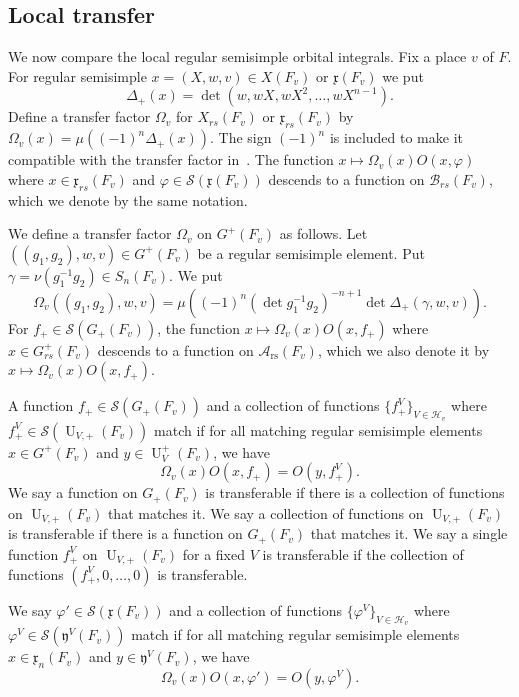 \documentclass[letterpaper,11pt]{amsart}
\newcommand{\fx}{\mathfrak{x}}
\newcommand{\fy}{\mathfrak{y}}
\newcommand{\cA}{\mathcal{A}}
\newcommand{\cB}{\mathcal{B}}
\newcommand{\cH}{\mathcal{H}}
\newcommand{\cS}{\mathcal{S}}
\newcommand{\<}{\negthickspace}
\DeclareMathOperator{\U}{U}
\theoremstyle{definition}
\theoremstyle{plain}
\theoremstyle{remark}
\numberwithin{equation}{section}
\begin{document}
\subsection{Local transfer}

We now compare the local regular semisimple orbital integrals. Fix a place $v$ of $F$. For regular semisimple $x = (X, w, v) \in X(F_v)$ or
$\fx(F_v)$ we put
    \[
    \Delta_+(x) =
    \det(w, wX, w X^2, \hdots, w X^{n-1}).
    \]
Define a transfer factor $\Omega_v$ for $X_{rs}(F_v)$ or $\fx_{rs}(F_v)$ by
$\Omega_v(x) = \mu((-1)^n\Delta_+(x))$. The sign $(-1)^n$ is included to make
it compatible with the transfer factor in~\cite{BP1}. The function $x \mapsto
\Omega_v(x) O(x, \varphi)$ where $x \in \fx_{rs}(F_v)$ and $\varphi \in
\cS(\fx(F_v))$ descends to a function on $\cB_{rs}(F_v)$, which we denote
by the same notation.

We define a transfer factor $\Omega_v$ on $G^+(F_v)$ as follows. Let $((g_1,
g_2), w, v) \in G^+(F_v)$ be a regular semisimple element. Put $\gamma = \nu(g_1^{-1} g_2) \in S_n(F_v)$. We put
    \[
    \Omega_v((g_1, g_2), w, v) = \mu \left( (-1)^n (\det g_1^{-1} g_2)^{-n+1}
    \det \Delta_+(\gamma, w, v) \right).
    \]
For $f_+ \in \cS(G_+(F_v))$, the function $x \mapsto \Omega_v(x) O(x, f_+)$ where $x \in G_{rs}^+(F_v)$ descends to a function on
$\cA_{\mathrm{rs}}(F_v)$, which we also denote it by $x \mapsto \Omega_v(x)O(x,f_+)$.

A function $f_+ \in \cS(G_+(F_v))$ and a collection of functions
$\{f_+^V\}_{V \in \cH_v}$ where $f_+^V \in \cS(\U_{V,+}(F_v))$ match if for
all matching regular semisimple elements $x \in G^+(F_v)$ and $y\in
\U_V^+(F_v)$, we have
    \[
    \Omega_v(x) O(x, f_+) = O(y, f_+^V).
    \]
We say a function on $G_+(F_v)$ is transferable if there is a collection of
functions on $\U_{V, +}(F_v)$ that matches it. We say a collection of
functions on $\U_{V, +}(F_v)$ is transferable if there is a function on
$G_+(F_v)$ that matches it. We say a single function $f_+^V$ on $\U_{V
,+}(F_v)$ for a fixed $V$ is transferable if the collection of functions
$(f_+^V, 0, \hdots, 0)$ is transferable.




We say $\varphi' \in \cS(\fx(F_v))$ and a collection of functions
$\{\varphi^V\}_{V \in \cH_v}$ where $\varphi^V \in \cS(\fy^{V}(F_v))$ match
if for all matching regular semisimple elements $x \in \fx_{n}(F_v)$ and $y
\in \fy^{V}(F_v)$, we have
    \[
    \Omega_v(x) O(x, \varphi') = O(y, \varphi^V).
    \]
\end{document}
